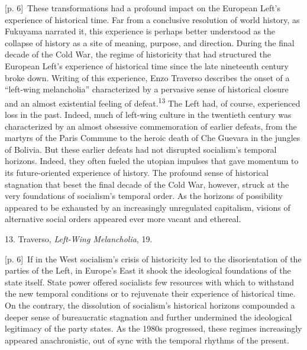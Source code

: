 \documentclass[10pt,a4paper]{article}
\begin{document}
{\scriptsize\color{gray} [p. 6]}\ These transformations had a profound impact on the European Left’s experience of historical time. Far from a conclusive resolution of world history, as Fukuyama narrated it, this experience is perhaps better understood as the collapse of history as a site of meaning, purpose, and direction. During the final decade of the Cold War, the regime of historicity that had structured the European Left’s experience of historical time since the late nineteenth century broke down. Writing of this experience, Enzo Traverso describes the onset of a “left-wing melancholia” characterized by a pervasive sense of historical closure and an almost existential feeling of defeat.\nobreak\textsuperscript{13} The Left had, of course, experienced loss in the past. Indeed, much of left-wing culture in the twentieth century was characterized by an almost obsessive commemoration of earlier defeats, from the martyrs of the Paris Commune to the heroic death of Che Guevara in the jungles of Bolivia. But these earlier defeats had not disrupted socialism’s temporal horizons. Indeed, they often fueled the utopian impulses that gave momentum to its future-oriented experience of history. The profound sense of historical stagnation that beset the final decade of the Cold War, however, struck at the very foundations of socialism’s temporal order. As the horizons of possibility appeared to be exhausted by an increasingly unregulated capitalism, visions of alternative social orders appeared ever more vacant and ethereal.\par{\small 13. Traverso, \textit{Left-Wing Melancholia}, 19.\par}
{\scriptsize\color{gray} [p. 6]}\ If in the West socialism’s crisis of historicity led to the disorientation of the parties of the Left, in Europe’s East it shook the ideological foundations of the state itself. State power offered socialists few resources with which to withstand the new temporal conditions or to rejuvenate their experience of historical time. On the contrary, the dissolution of socialism’s historical horizons compounded a deeper sense of bureaucratic stagnation and further undermined the ideological legitimacy of the party states. As the 1980s progressed, these regimes increasingly appeared anachronistic, out of sync with the temporal rhythms of the present.\par
\end{document}
